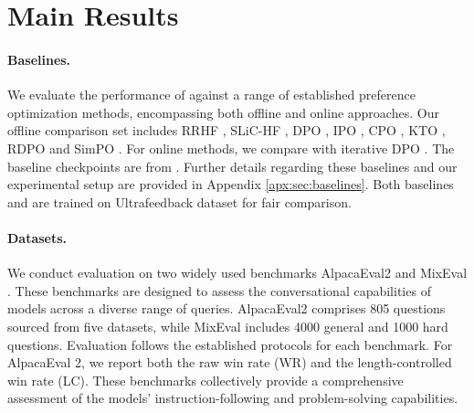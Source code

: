 

\section{Main Results}\label{sec:main-result}

\paragraph{Baselines.}
We evaluate the performance of \Ours against a range of established preference optimization methods, encompassing both offline and online approaches.
Our offline comparison set includes RRHF \citep{yuan2023rrhf}, SLiC-HF \citep{zhao2023slic}, DPO \citep{guo2024direct}, IPO \citep{azar2024general}, CPO \citep{xu2024contrastive}, KTO \citep{ethayarajh2024kto}, RDPO \citep{park2024disentangling} and SimPO \citep{meng2024simpo}.
For online methods, we compare with iterative DPO \citep{xiong2024iterative}.
The baseline checkpoints are from \citep{meng2024simpo}.
Further details regarding these baselines and our experimental setup are provided in Appendix \ref{apx:sec:baselines}.
Both baselines and \Ours are trained on Ultrafeedback dataset \citep{cui2024ultrafeedback} for fair comparison.

\paragraph{Datasets.} We conduct evaluation on two widely used benchmarks AlpacaEval2 \citep{dubois2024length} and MixEval \citep{ni2024mixeval}.  
These benchmarks are designed to assess the conversational capabilities of models across a diverse range of queries. AlpacaEval2 comprises 805 questions sourced from five datasets, while MixEval includes 4000 general and 1000 hard questions.
Evaluation follows the established protocols for each benchmark. For AlpacaEval 2, we report both the raw win rate (WR) and the length-controlled win rate (LC). These benchmarks collectively provide a comprehensive assessment of the models' instruction-following and problem-solving capabilities.

